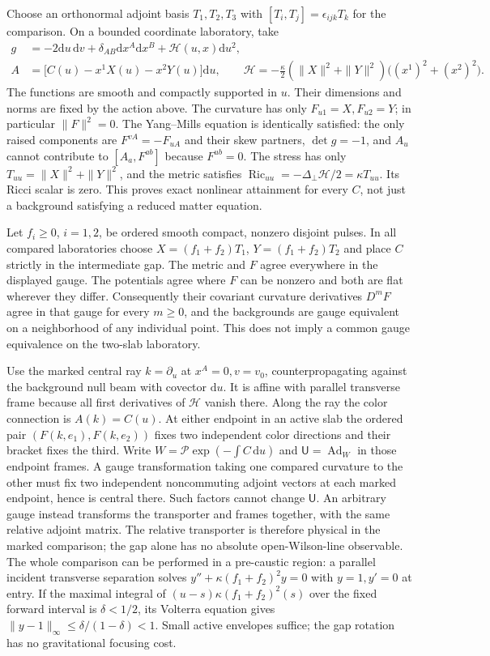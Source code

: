 \documentclass[11pt]{article}
\newcommand{\dd}{\mathrm d}
\newcommand{\Ad}{\operatorname{Ad}}
\newcommand{\Ric}{\operatorname{Ric}}
\begin{document}
Choose an orthonormal adjoint basis \(T_1,T_2,T_3\) with
\([T_i,T_j]=\epsilon_{ijk}T_k\) for the comparison. On a bounded coordinate laboratory, take
\begin{align}\label{eq:ansatz}
 g&=-2\dd u\,\dd v+\delta_{AB}\dd x^A\dd x^B
                         +\mathcal H(u,x)\dd u^2,\\
 A&=\big[C(u)-x^1 X(u)-x^2 Y(u)\big]\dd u,\qquad
 \mathcal H=-\tfrac{\kappa}{2}
   (\|X\|^2+\|Y\|^2)\big((x^1)^2+(x^2)^2\big).\nonumber
\end{align}
The functions are smooth and compactly supported in \(u\). Their dimensions and norms are fixed by the action above. The curvature has only \(F_{u1}=X,F_{u2}=Y\); in particular \(\|F\|^2=0\). The Yang--Mills equation is identically satisfied: the only raised components are \(F^{vA}=-F_{uA}\) and their skew partners, \(\det g=-1\), and \(A_u\) cannot contribute to \([A_a,F^{ab}]\) because \(F^{ub}=0\). The stress has only \(T_{uu}=\|X\|^2+\|Y\|^2\), and the metric satisfies \(\Ric_{uu}=-\Delta_\perp\mathcal H/2=\kappa T_{uu}\). Its Ricci scalar is zero. This proves exact nonlinear attainment for every \(C\), not just a background satisfying a reduced matter equation.

Let \(f_i\ge0\), \(i=1,2\), be ordered smooth compact, nonzero disjoint pulses. In all compared laboratories choose \(X=(f_1+f_2)T_1\), \(Y=(f_1+f_2)T_2\) and place \(C\) strictly in the intermediate gap. The metric and \(F\) agree everywhere in the displayed gauge. The potentials agree where \(F\) can be nonzero and both are flat wherever they differ. Consequently their covariant curvature derivatives \(D^mF\) agree in that gauge for every \(m\ge0\), and the backgrounds are gauge equivalent on a neighborhood of any individual point. This does not imply a common gauge equivalence on the two-slab laboratory.

Use the marked central ray \(k=\partial_u\) at \(x^A=0,v=v_0\), counterpropagating against the background null beam with covector \(\dd u\). It is affine with parallel transverse frame because all first derivatives of \(\mathcal H\) vanish there. Along the ray the color connection is \(A(k)=C(u)\). At either endpoint in an active slab the ordered pair \((F(k,e_1),F(k,e_2))\) fixes two independent color directions and their bracket fixes the third. Write \(W=\mathcal P\exp(-\int C\,\dd u)\) and \(\mathsf U=\Ad_W\) in those endpoint frames. A gauge transformation taking one compared curvature to the other must fix two independent noncommuting adjoint vectors at each marked endpoint, hence is central there. Such factors cannot change \(\mathsf U\). An arbitrary gauge instead transforms the transporter and frames together, with the same relative adjoint matrix. The relative transporter is therefore physical in the marked comparison; the gap alone has no absolute open-Wilson-line observable. The whole comparison can be performed in a pre-caustic region: a parallel incident transverse separation solves \(y''+\kappa(f_1+f_2)^2 y=0\) with \(y=1,y'=0\) at entry. If the maximal integral of \((u-s)\kappa(f_1+f_2)^2(s)\) over the fixed forward interval is \(\delta<1/2\), its Volterra equation gives \(\|y-1\|_\infty\le\delta/(1-\delta)<1\). Small active envelopes suffice; the gap rotation has no gravitational focusing cost.
\end{document}
